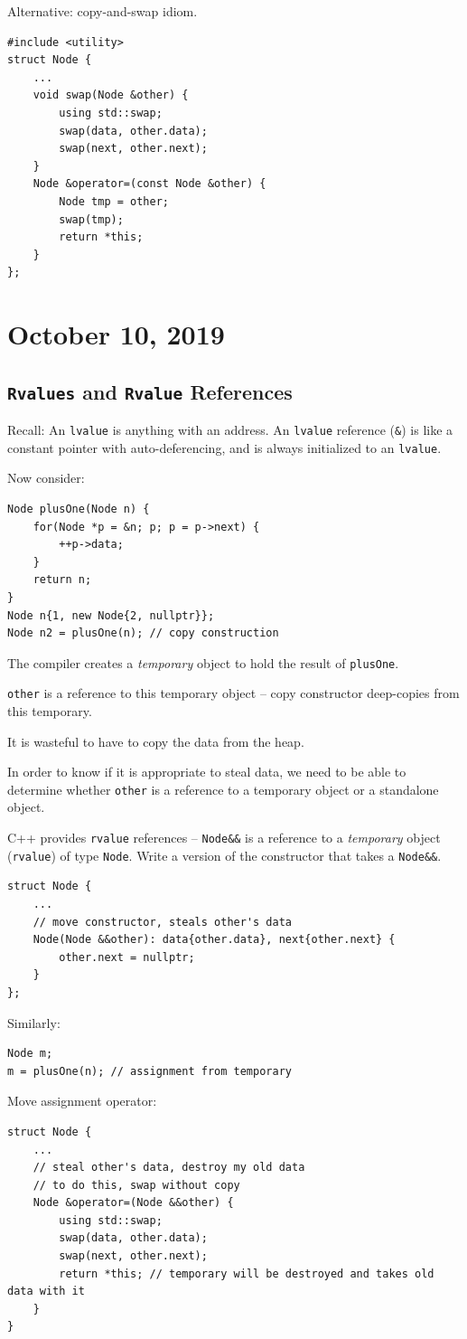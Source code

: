 \documentclass[11pt]{article}
\theoremstyle{definition}
\begin{document}
Alternative: copy-and-swap idiom.
\begin{lstlisting}
#include <utility>
struct Node {
    ...
    void swap(Node &other) {
        using std::swap;
        swap(data, other.data);
        swap(next, other.next);
    }
    Node &operator=(const Node &other) {
        Node tmp = other;
        swap(tmp);
        return *this;
    }
};
\end{lstlisting}
\newpage

\section{October 10, 2019}

\subsection{{\tt Rvalues} and {\tt Rvalue} References}
Recall: An {\tt lvalue} is anything with an address. An {\tt lvalue} reference ({\tt \&}) is like a constant pointer with auto-deferencing, and is always initialized to an {\tt lvalue}.

Now consider:
\begin{lstlisting}
Node plusOne(Node n) {
    for(Node *p = &n; p; p = p->next) {
        ++p->data;
    }
    return n;
}
Node n{1, new Node{2, nullptr}};
Node n2 = plusOne(n); // copy construction
\end{lstlisting}
The compiler creates a {\it temporary} object to hold the result of {\tt plusOne}. 

{\tt other} is a reference to this temporary object -- copy constructor deep-copies from this temporary.

It is wasteful to have to copy the data from the heap. 

In order to know if it is appropriate to steal data, we need to be able to determine whether {\tt other} is a reference to a temporary object or a standalone object.

C++ provides {\tt rvalue} references -- {\tt Node\&\&} is a reference to a {\it temporary} object ({\tt rvalue}) of type {\tt Node}. Write a version of the constructor that takes a {\tt Node\&\&}.
\begin{lstlisting}
struct Node {
    ...
    // move constructor, steals other's data
    Node(Node &&other): data{other.data}, next{other.next} {
        other.next = nullptr;
    } 
};
\end{lstlisting}
Similarly:
\begin{lstlisting}
Node m;
m = plusOne(n); // assignment from temporary
\end{lstlisting}
Move assignment operator:
\begin{lstlisting}
struct Node {
    ...
    // steal other's data, destroy my old data
    // to do this, swap without copy
    Node &operator=(Node &&other) {
        using std::swap;
        swap(data, other.data);
        swap(next, other.next);
        return *this; // temporary will be destroyed and takes old data with it
    }
}
\end{lstlisting}
\end{document}
